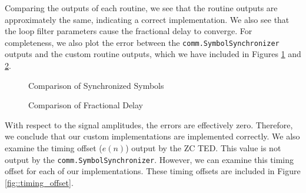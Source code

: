 \documentclass{article}
\begin{document}
\noindent Comparing the outputs of each routine, we see that the routine outputs are approximately the same, indicating a correct implementation. We also see that the loop filter parameters cause the fractional delay to converge. For completeness, we also plot the error between the \texttt{comm.SymbolSynchronizer} outputs and the custom routine outputs, which we have included in Figures \ref{fig::symbol_sync_error} and \ref{fig::fractional_delay_error}.

\begin{figure}[H]
	\centerline{}
	\caption{Comparison of Synchronized Symbols}
	\label{fig::symbol_sync_error}
\end{figure}

\begin{figure}[H]
	\centerline{}
	\caption{Comparison of Fractional Delay}
	\label{fig::fractional_delay_error}
\end{figure}

\noindent With respect to the signal amplitudes, the errors are effectively zero. Therefore, we conclude that our custom implementations are implemented correctly. We also examine the timing offset ($e(n)$) output by the ZC TED. This value is not output by the \texttt{comm.SymbolSynchronizer}. However, we can examine this timing offset for each of our implementations. These timing offsets are included in Figure \ref{fig::timing_offset}. 
\end{document}
